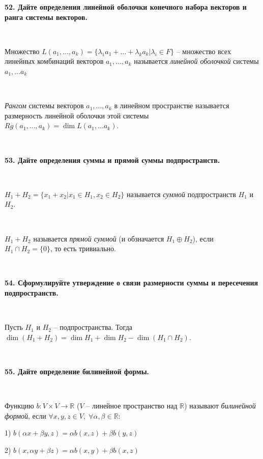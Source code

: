 \documentclass{article}
\begin{document}
    \textbf{52. Дайте определения линейной оболочки конечного набора векторов и ранга системы векторов.}

    {
        $\;$
        \setlength{\parindent}{0.4cm}
        \hangindent=0.4cm

    Множество $L(a_1, \ldots, a_k)=\{\lambda_1a_1+\ldots+\lambda_ka_k|\lambda_i\in F \}$ -- множество всех линейных комбинаций векторов $a_1, \ldots, a_k$ называется \textit{линейной оболочкой} системы $a_1, \ldots a_k$

        $\;$

        \textit{Рангом} системы векторов $a_1, \ldots, a_k$ в линейном пространстве называется размерность линейной оболочки этой системы $Rg(a_1, \ldots, a_k)=\dim L(a_1, \ldots a_k)$.

        $\;$
        \setlength{\parindent}{0cm}
        \hangindent=0cm
    }

    \textbf{53. Дайте определения суммы и прямой суммы подпространств.}

    {
        $\;$
        \setlength{\parindent}{0.4cm}
        \hangindent=0.4cm

        $H_1+H_2=\{x_1+x_2|x_1\in H_1, x_2\in H_2 \}$ называется \textit{суммой} подпространств $H_1$ и $H_2$.

        $\;$

        $H_1+H_2$ называется \textit{прямой суммой} (и обзначается $H_1\oplus H_2$), если $H_1\cap H_2=\{0\}$, то есть тривиально.

        $\;$
        \setlength{\parindent}{0cm}
        \hangindent=0cm
    }

    \textbf{54. Сформулируйте утверждение о связи размерности суммы и пересечения подпространств.}

    {
        $\;$
        \setlength{\parindent}{0.4cm}
        \hangindent=0.4cm

    Пусть $H_1$ и $H_2$ -- подпространства. Тогда $\dim(H_1+H_2)=\dim H_1+\dim H_2-\dim(H_1\cap H_2)$.

        $\;$
        \setlength{\parindent}{0cm}
        \hangindent=0cm
    }

    \textbf{55. Дайте определение билинейной формы.}

    {
        $\;$
        \setlength{\parindent}{0.4cm}
        \hangindent=0.4cm

    Функцию $b:V\times V\rightarrow\mathbb{R}$ ($V$ -- линейное пространство над $\mathbb{R}$)  называют \textit{билинейной формой}, если $\forall x, y, z\in V, \;\forall\alpha, \beta\in\mathbb{R}$:

    1) $b(\alpha x+\beta y, z)=\alpha b(x, z)+\beta b(y, z)$

        2) $b(x, \alpha y+\beta z)=\alpha b(x, y)+\beta b(x, z)$

        $\;$
        \setlength{\parindent}{0cm}
        \hangindent=0cm
    }
\end{document}
